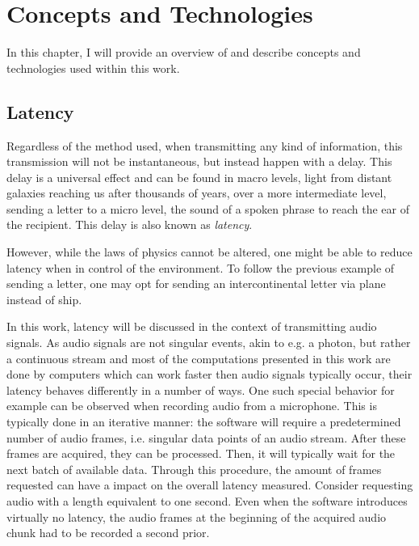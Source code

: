 

\chapter{Concepts and Technologies}
\label{basics:start}
In this chapter, I will provide an overview of and describe concepts and technologies used within this work.




\section{Latency}
\label{basics:latency}
Regardless of the method used, when transmitting any kind of information, this transmission will not be instantaneous, but instead happen with a delay.
This delay is a universal effect and can be found in macro levels, light from distant galaxies reaching us after thousands of years, over a more intermediate level, sending a letter to a micro level, the sound of a spoken phrase to reach the ear of the recipient.
This delay is also known as \textit{latency}.

However, while the laws of physics cannot be altered, one might be able to reduce latency when in control of the environment.
To follow the previous example of sending a letter, one may opt for sending an intercontinental letter via plane instead of ship.

In this work, latency will be discussed in the context of transmitting audio signals.
As audio signals are not singular events, akin to e.g. a photon, but rather a continuous stream and most of the computations presented in this work are done by computers which can work faster then audio signals typically occur, their latency behaves differently in a number of ways. %
One such special behavior for example can be observed when recording audio from a microphone.
This is typically done in an iterative manner:
the software will require a predetermined number of audio frames, i.e. singular data points of an audio stream.
After these frames are acquired, they can be processed.
Then, it will typically wait for the next batch of available data.
Through this procedure, the amount of frames requested can have a impact on the overall latency measured.
Consider requesting audio with a length equivalent to one second.
Even when the software introduces virtually no latency, the audio frames at the beginning of the acquired audio chunk had to be recorded a second prior.

